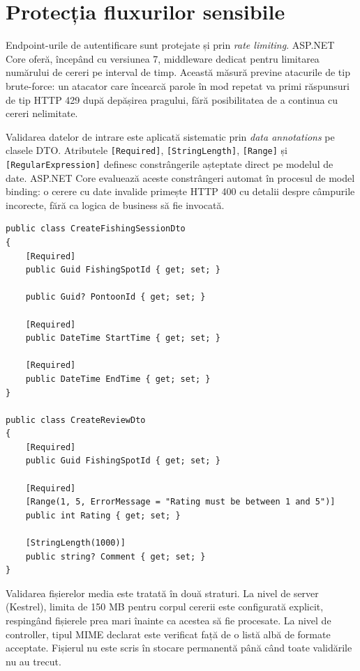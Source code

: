 \section{Protecția fluxurilor sensibile}

Endpoint-urile de autentificare sunt protejate și prin \emph{rate limiting}. ASP.NET Core oferă, începând cu versiunea 7, middleware dedicat pentru limitarea numărului de cereri pe interval de timp. Această măsură previne atacurile de tip brute-force: un atacator care încearcă parole în mod repetat va primi răspunsuri de tip HTTP 429 după depășirea pragului, fără posibilitatea de a continua cu cereri nelimitate.

Validarea datelor de intrare este aplicată sistematic prin \emph{data annotations} pe clasele DTO. Atributele \texttt{[Required]}, \texttt{[StringLength]}, \texttt{[Range]} și \texttt{[RegularExpression]} definesc constrângerile așteptate direct pe modelul de date. ASP.NET Core evaluează aceste constrângeri automat în procesul de model binding: o cerere cu date invalide primește HTTP 400 cu detalii despre câmpurile incorecte, fără ca logica de business să fie invocată.

\begin{lstlisting}[language={[Sharp]C}, caption={Exemplu de DTO cu validare declarativă prin DataAnnotations}]
public class CreateFishingSessionDto
{
    [Required]
    public Guid FishingSpotId { get; set; }

    public Guid? PontoonId { get; set; }

    [Required]
    public DateTime StartTime { get; set; }

    [Required]
    public DateTime EndTime { get; set; }
}

public class CreateReviewDto
{
    [Required]
    public Guid FishingSpotId { get; set; }

    [Required]
    [Range(1, 5, ErrorMessage = "Rating must be between 1 and 5")]
    public int Rating { get; set; }

    [StringLength(1000)]
    public string? Comment { get; set; }
}
\end{lstlisting}

Validarea fișierelor media este tratată în două straturi. La nivel de server (Kestrel), limita de 150 MB pentru corpul cererii este configurată explicit, respingând fișierele prea mari înainte ca acestea să fie procesate. La nivel de controller, tipul MIME declarat este verificat față de o listă albă de formate acceptate. Fișierul nu este scris în stocare permanentă până când toate validările nu au trecut.

